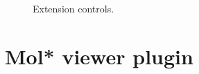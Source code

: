 \documentclass[
  digital,     %
  oneside,     %
  nosansbold,  %
  nocolorbold, %
  lof,         %
  lot,         %
]{fithesis4}
\begin{document}
\begin{figure}[htbp]
  \centering
  \caption{Extension controls.}
  \label{fig:controls-charge-set}
\end{figure}

\section{Mol* viewer plugin}
\label{chapter:molstar_viewer_plugin}
\end{document}
